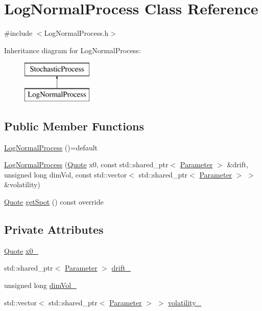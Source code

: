 \hypertarget{class_log_normal_process}{}\section{Log\+Normal\+Process Class Reference}
\label{class_log_normal_process}


{\ttfamily \#include $<$Log\+Normal\+Process.\+h$>$}

Inheritance diagram for Log\+Normal\+Process\+:\begin{figure}[H]
\begin{center}
\leavevmode
\includegraphics[height=2.000000cm]{class_log_normal_process}
\end{center}
\end{figure}
\subsection*{Public Member Functions}
\begin{DoxyCompactItemize}
\item 
\hyperlink{class_log_normal_process_aef0d0728fe801074ee79abcf099e30e2}{Log\+Normal\+Process} ()=default
\item 
\hyperlink{class_log_normal_process_ace234a1856730ea48978eaf3cb3f7a79}{Log\+Normal\+Process} (\hyperlink{_name_def_8h_a642a6c5fd87319d922637de0e0bb0305}{Quote} x0, const std\+::shared\+\_\+ptr$<$ \hyperlink{class_parameter}{Parameter} $>$ \&drift, unsigned long dim\+Vol, const std\+::vector$<$ std\+::shared\+\_\+ptr$<$ \hyperlink{class_parameter}{Parameter} $>$ $>$ \&volatility)
\item 
\hyperlink{_name_def_8h_a642a6c5fd87319d922637de0e0bb0305}{Quote} \hyperlink{class_log_normal_process_a3732c44145aa35d1e2000cc0140bfb03}{get\+Spot} () const override
\end{DoxyCompactItemize}
\subsection*{Private Attributes}
\begin{DoxyCompactItemize}
\item 
\hyperlink{_name_def_8h_a642a6c5fd87319d922637de0e0bb0305}{Quote} \hyperlink{class_log_normal_process_a209592d8c0657d00ecbb3072567903e1}{x0\+\_\+}
\item 
std\+::shared\+\_\+ptr$<$ \hyperlink{class_parameter}{Parameter} $>$ \hyperlink{class_log_normal_process_a0d4e011f211503c5bc8482f68e257074}{drift\+\_\+}
\item 
unsigned long \hyperlink{class_log_normal_process_a2ef2bb09ad7763645dd2d8396355fdb0}{dim\+Vol\+\_\+}
\item 
std\+::vector$<$ std\+::shared\+\_\+ptr$<$ \hyperlink{class_parameter}{Parameter} $>$ $>$ \hyperlink{class_log_normal_process_ac51be6698f524d4cc5da8ccbdd4e1256}{volatility\+\_\+}
\end{DoxyCompactItemize}


